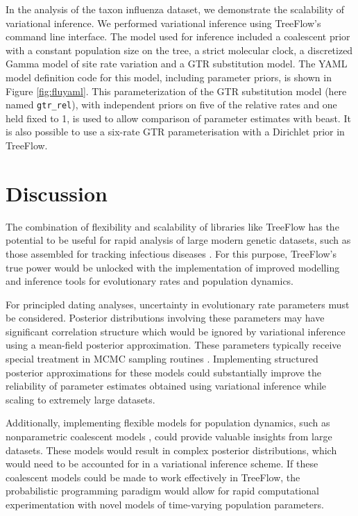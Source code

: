 In the analysis of the  taxon influenza dataset, we demonstrate the scalability of variational inference. We performed variational inference using TreeFlow's command line interface. The model used for inference included a coalescent prior with a constant population size on the tree, a strict molecular clock, a discretized Gamma model of site rate variation and a GTR substitution model. The YAML model definition code for this model, including parameter priors, is shown in Figure \ref{fig:fluyaml}. This parameterization of the GTR substitution model (here named \texttt{gtr_rel}), with independent priors on five of the relative rates and one held fixed to 1, is used to allow comparison of parameter estimates with beast. It is also possible to use a six-rate GTR parameterisation with a Dirichlet prior in TreeFlow.


\section{Discussion}

The combination of flexibility and scalability of libraries like TreeFlow has the potential to be useful for rapid analysis of large modern genetic datasets, such as those assembled for tracking infectious diseases \cite{hadfield2018nextstrain}. For this purpose, TreeFlow's true power would be unlocked with the implementation of improved modelling and inference tools for evolutionary rates and population dynamics.

For principled dating analyses, uncertainty in evolutionary rate parameters must be considered. Posterior distributions involving these parameters may have significant correlation structure which would be ignored by variational inference using a mean-field posterior approximation. These parameters typically receive special treatment in MCMC sampling routines \cite{drummond2006relaxed, zhang2020improving}. Implementing structured posterior approximations for these models could substantially improve the reliability of parameter estimates obtained using variational inference while scaling to extremely large datasets.

Additionally, implementing flexible models for population dynamics, such as nonparametric coalescent models \cite{drummond2005bayesian, minin2008smooth, gill2013improving}, could provide valuable insights from large datasets. These models would result in complex posterior distributions, which would need to be accounted for in a variational inference scheme. If these coalescent models could be made to work effectively in TreeFlow, the probabilistic programming paradigm would allow for rapid computational experimentation with novel models of time-varying population parameters.

